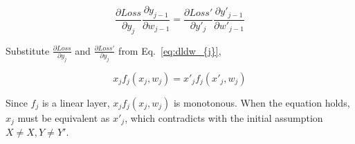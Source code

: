 \begin{equation}
    \frac{\partial Loss}{\partial y_{j}}
    \frac{\partial y_{j-1}}{\partial w_{j-1}}
    = 
    \frac{\partial Loss'}{\partial y'_{j}}
    \frac{\partial y'_{j-1}}{\partial w'_{j-1}}
\end{equation}

Substitute $\frac{\partial Loss}{\partial y_{j}}$ and $\frac{\partial Loss'}{\partial y_{j}}$ from Eq.~\ref{eq:dldw_{j}},

\begin{equation}
    x_{j} f_{j} (x_{j}, w_{j}) 
    =
    x'_{j} f_{j} (x'_{j}, w_{j}) 

\end{equation}


Since $f_j$ is a linear layer, $x_j f_j(x_j, w_j)$ is monotonous. When the equation holds, $ x_{j} $ must be equivalent as  $ x'_{j} $, which contradicts with the initial assumption $X \neq X, Y \neq Y'$.  